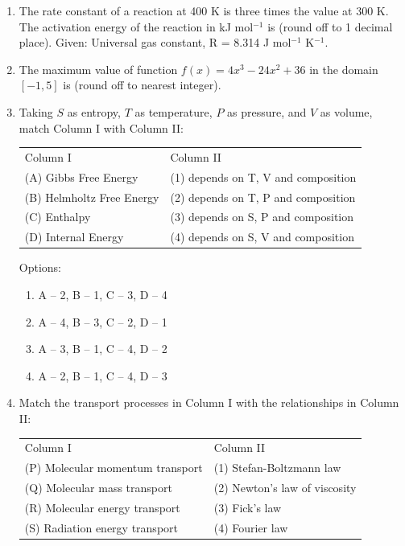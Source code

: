 \documentclass[12pt]{article}
\begin{document}
\begin{enumerate}
\item The rate constant of a reaction at 400 K is three times the value at 300 K. The activation energy of the reaction in kJ mol\(^{-1}\) is \underline{\hspace{2cm}} (round off to 1 decimal place).  
Given: Universal gas constant, R = 8.314 J mol\(^{-1}\) K\(^{-1}\).

\item The maximum value of function \(f(x) = 4x^3 - 24x^2 + 36\) in the domain \([-1,5]\) is \underline{\hspace{2cm}} (round off to nearest integer).

\item Taking \(S\) as entropy, \(T\) as temperature, \(P\) as pressure, and \(V\) as volume, match Column I with Column II:

\begin{center}
\begin{tabular}{ll}
Column I & Column II \\
(A) Gibbs Free Energy & (1) depends on T, V and composition \\
(B) Helmholtz Free Energy & (2) depends on T, P and composition \\
(C) Enthalpy & (3) depends on S, P and composition \\
(D) Internal Energy & (4) depends on S, V and composition \\
\end{tabular}
\end{center}

Options:  
\begin{enumerate}[label=(\alph*)]
\item A – 2, B – 1, C – 3, D – 4
\item A – 4, B – 3, C – 2, D – 1
\item A – 3, B – 1, C – 4, D – 2
\item A – 2, B – 1, C – 4, D – 3
\end{enumerate}

\item Match the transport processes in Column I with the relationships in Column II:

\begin{center}
\begin{tabular}{ll}
Column I & Column II \\
(P) Molecular momentum transport & (1) Stefan-Boltzmann law \\
(Q) Molecular mass transport & (2) Newton’s law of viscosity \\
(R) Molecular energy transport & (3) Fick’s law \\
(S) Radiation energy transport & (4) Fourier law \\
\end{tabular}
\end{center}


\end{enumerate}
\end{document}
